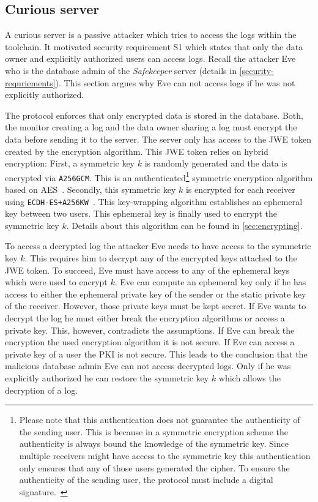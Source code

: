 \documentclass[../main.tex]{subfiles}
\begin{document}
\subsection{Curious server}
A curious server is a passive attacker which tries to access the logs within the toolchain.
It motivated security requirement S1 which states that only the data owner and explicitly authorized users can access logs.
Recall the attacker Eve who is the database admin of the \emph{Safekeeper} server (details in \cref{security-requriements}).
This section argues why Eve can not access logs if he was not explicitly authorized.

The protocol enforces that only encrypted data is stored in the database.
Both, the monitor creating a log and the data owner sharing a log must encrypt the data before sending it to the server.
The server only has access to the JWE token created by the encryption algorithm.
This JWE token relies on hybrid encryption:
First, a symmetric key $k$ is randomly generated and the data is encrypted via \verb|A256GCM|.
This is an authenticated\footnote{Please note that this authentication does not guarantee the authenticity of the sending user. This is because in a symmetric encryption scheme the authenticity is always bound the knowledge of the symmetric key. Since multiple receivers might have access to the symmetric key this authentication only ensures that any of those users generated the cipher. To ensure the authenticity of the sending user, the protocol must include a digital signature.~\cite[315]{Eckert2018}} symmetric encryption algorithm based on AES~\cite{JWA2015}.
Secondly, this symmetric key $k$ is encrypted for each receiver using \verb|ECDH-ES+A256KW|~\cite{JWA2015}.
This key-wrapping algorithm establishes an ephemeral key between two users.
This ephemeral key is finally used to encrypt the symmetric key $k$.
Details about this algorithm can be found in \cref{sec:encrypting}.

To access a decrypted log the attacker Eve needs to have access to the symmetric key $k$.
This requires him to decrypt any of the encrypted keys attached to the JWE token.
To succeed, Eve must have access to any of the ephemeral keys which were used to encrypt $k$.
Eve can compute an ephemeral key only if he has access to either the ephemeral private key of the sender or the static private key of the receiver.
However, those private keys must be kept secret.
If Eve wants to decrypt the log he must either break the encryption algorithms or access a private key.
This, however, contradicts the assumptions.
If Eve can break the encryption the used encryption algorithm it is not secure.
If Eve can access a private key of a user the PKI is not secure.
This leads to the conclusion that the malicious database admin Eve can not access decrypted logs.
Only if he was explicitly authorized he can restore the symmetric key $k$ which allows the decryption of a log.
\end{document}
